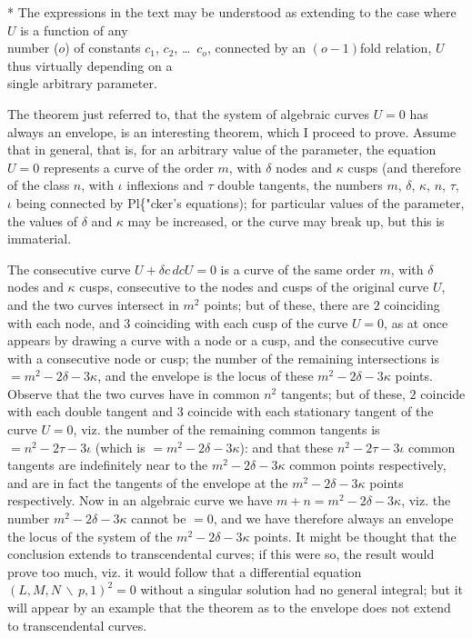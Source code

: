 \documentclass[12pt,a4paper]{article}
\theoremstyle{plain}
\theoremstyle{definition}
\theoremstyle{remark}
\begin{document}
\begin{flushright}
* The expressions in the text may be understood as extending to the case where $U$ is a function of any\\
number ($o$) of constants $c_1$, $c_2$, \ldots\ $c_o$, connected by an $(o-1)$fold relation, $U$ thus virtually depending on a\\
single arbitrary parameter.
\end{flushright}

The theorem just referred to, that the system of algebraic curves $U = 0$ has always an envelope, is an interesting theorem, which I proceed to prove. Assume that in general, that is, for an arbitrary value of the parameter, the equation $U = 0$ represents a curve of the order $m$, with $\delta$ nodes and $\kappa$ cusps (and therefore of the class $n$, with $\iota$ inflexions and $\tau$ double tangents, the numbers $m$, $\delta$, $\kappa$, $n$, $\tau$, $\iota$ being connected by Pl\{"cker's equations); for particular values of the parameter, the values of $\delta$ and $\kappa$ may be increased, or the curve may break up, but this is immaterial.

The consecutive curve $U + \delta c\, dc U = 0$ is a curve of the same order $m$, with $\delta$ nodes and $\kappa$ cusps, consecutive to the nodes and cusps of the original curve $U$, and the two curves intersect in $m^2$ points; but of these, there are $2$ coinciding with each node, and $3$ coinciding with each cusp of the curve $U = 0$, as at once appears by drawing a curve with a node or a cusp, and the consecutive curve with a consecutive node or cusp; the number of the remaining intersections is $= m^2 - 2\delta - 3\kappa$, and the envelope is the locus of these $m^2 - 2\delta - 3\kappa$ points. Observe that the two curves have in common $n^2$ tangents; but of these, $2$ coincide with each double tangent and $3$ coincide with each stationary tangent of the curve $U = 0$, viz. the number of the remaining common tangents is $= n^2 - 2\tau - 3\iota$ (which is $= m^2 - 2\delta - 3\kappa$): and that these $n^2 - 2\tau - 3\iota$ common tangents are indefinitely near to the $m^2 - 2\delta - 3\kappa$ common points respectively, and are in fact the tangents of the envelope at the $m^2 - 2\delta - 3\kappa$ points respectively. Now in an algebraic curve we have $m + n = m^2 - 2\delta - 3\kappa$, viz. the number $m^2 - 2\delta - 3\kappa$ cannot be $=0$, and we have therefore always an envelope the locus of the system of the $m^2 - 2\delta - 3\kappa$ points. It might be thought that the conclusion extends to transcendental curves; if this were so, the result would prove too much, viz. it would follow that a differential equation $(L, M, N \,\backslash\, p, 1)^2 = 0$ without a singular solution had no general integral; but it will appear by an example that the theorem as to the envelope does not extend to transcendental curves.
\end{document}
